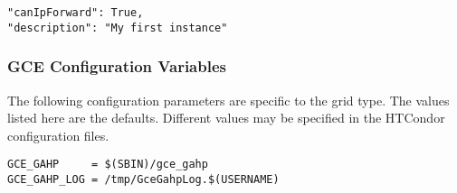 \begin{verbatim}
"canIpForward": True,
"description": "My first instance"
\end{verbatim}

\subsubsection{\label{sec:Gce-config}GCE Configuration Variables}

The following configuration parameters are specific to the 
grid type. 
The values listed here are the defaults. 
Different values may be specified in the HTCondor configuration files.

\footnotesize
\begin{verbatim}
GCE_GAHP     = $(SBIN)/gce_gahp
GCE_GAHP_LOG = /tmp/GceGahpLog.$(USERNAME)
\end{verbatim}
\normalsize
